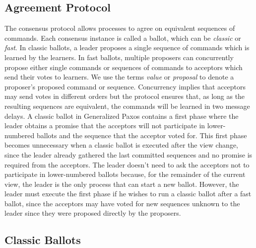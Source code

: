 \subsection{Agreement Protocol} 

The consensus protocol allows processes to agree on equivalent sequences of commands. Each consensus instance is called a ballot, which can be \textit{classic} or \textit{fast}. In classic ballots, a leader proposes a single sequence of commands which is learned by the learners. In fast ballots, multiple proposers can concurrently propose either single commands or sequences of commands to acceptors which send their votes to learners. We use the terms \textit{value} or \textit{proposal} to denote a proposer's proposed command or sequence. Concurrency implies that acceptors may send votes in different orders but the protocol ensures that, as long as the resulting sequences are equivalent, the commands will be learned in two message delays. A classic ballot in Generalized Paxos contains a first phase where the leader obtains a promise that the acceptors will not participate in lower-numbered ballots and the sequence that the acceptor voted for. This first phase becomes unnecessary when a classic ballot is executed after the view change, since the leader already gathered the last committed sequences and no promise is required from the acceptors. The leader doesn't need to ask the acceptors not to participate in lower-numbered ballots because, for the remainder of the current view, the leader is the only process that can start a new ballot.  However, the leader must execute the first phase if he wishes to run a classic ballot after a fast ballot, since the acceptors may have voted for new sequences unknown to the leader since they were proposed directly by the proposers. \par

\subsection{Classic Ballots} 

